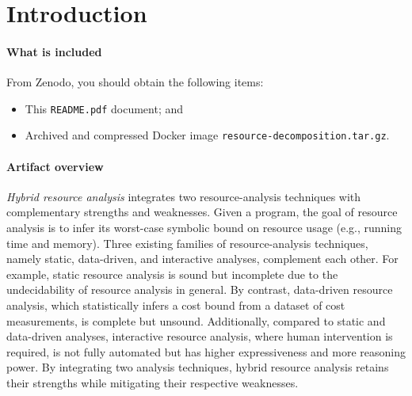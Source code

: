 
\section{Introduction}

\paragraph{What is included}

From Zenodo, you should obtain the following items:
\begin{itemize}
      \item This \texttt{README.pdf} document; and
      \item Archived and compressed Docker image
            \texttt{resource-decomposition.tar.gz}.
\end{itemize}

\paragraph{Artifact overview}

\emph{Hybrid resource analysis} integrates two resource-analysis techniques with
complementary strengths and weaknesses.
%
Given a program, the goal of resource analysis is to infer its worst-case
symbolic bound on resource usage (e.g., running time and memory).
%
Three existing families of resource-analysis techniques, namely static,
data-driven, and interactive analyses, complement each other.
%
For example, static resource analysis is sound but incomplete due to the
undecidability of resource analysis in general.
%
By contrast, data-driven resource analysis, which statistically infers a cost
bound from a dataset of cost measurements, is complete but unsound.
%
Additionally, compared to static and data-driven analyses, interactive resource
analysis, where human intervention is required, is not fully automated but has
higher expressiveness and more reasoning power.
%
By integrating two analysis techniques, hybrid resource analysis retains their
strengths while mitigating their respective weaknesses.

